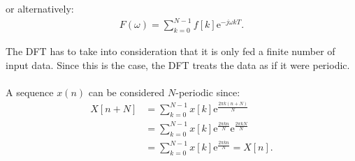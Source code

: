 or alternatively:
\begin{align*}
	F(\omega) = \sum_{k=0}^{N-1}f[k]\text{e}^{-j\omega k T}.
\end{align*}


The DFT has to take into consideration that it is only fed a finite number of input data. Since this is the case, the DFT treats the data as if it were periodic.
\\ \\
A sequence $x(n)$ can be considered $N$-periodic since:
\begin{align*}
	X[n+N]
	&= \sum_{k=0}^{N-1} x[k] \text{e}^{\frac{2 \pi k (n+N)}{N}}		\\
	&= \sum_{k=0}^{N-1} x[k] \text{e}^{\frac{2 \pi k n}{N}}			\text{e}^{\frac{2 \pi k N}{N}} \\
	&= \sum_{k=0}^{N-1} x[k] \text{e}^{\frac{2 \pi k n}{N}} = 		X[n].
\end{align*}

